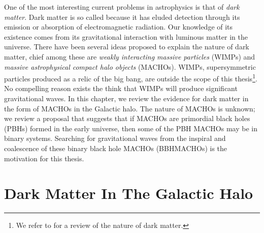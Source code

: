 
One of the most interesting current problems in astrophysics is that of
\emph{dark matter}. Dark matter is so called because it has eluded detection
through its emission or absorption of electromagnetic radiation. Our knowledge
of its existence comes from its gravitational interaction with luminous matter
in the universe. There have been several ideas proposed to explain the nature
of dark matter, chief among these are \emph{weakly interacting massive
particles} (WIMPs) and \emph{massive astrophysical compact halo objects}
(MACHOs)\cite{Griest:1990vu}.  WIMPs, supersymmetric particles produced as a
relic of the big bang, are outside the scope of this thesis\footnote{We refer
to \cite{Griest:1995gs} for a review of the nature of dark matter.}. No
compelling reason exists the think that WIMPs will produce significant
gravitational waves. In this chapter, we review the evidence for dark matter
in the form of MACHOs in the Galactic halo. The nature of MACHOs is unknown;
we review a proposal that suggests that if MACHOs are primordial black holes
(PBHs) formed in the early universe, then some of the PBH MACHOs may be in
binary systems\cite{Nakamura:1997sm}. Searching for gravitational waves from
the inspiral and coalescence of these binary black hole MACHOs (BBHMACHOs) is
the motivation for this thesis.

\section{Dark Matter In The Galactic Halo}
\label{s:darkmatter}

